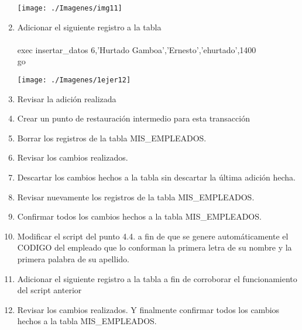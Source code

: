 \begin{enumerate}[1.]
	\begin{center}
	\texttt{[image: ./Imagenes/img11]} 
	\end{center}

	\item Adicionar el siguiente registro a la tabla
           \\
	\\exec insertar\_datos 6,'Hurtado Gamboa','Ernesto','ehurtado',1400
	\\ go

	\begin{center}
	\texttt{[image: ./Imagenes/1ejer12]} 
	\end{center}

	\item Revisar la adición realizada
	\item Crear un punto de restauración intermedio para esta transacción
	\item Borrar los registros de la tabla MIS\_EMPLEADOS.
	\item Revisar los cambios realizados.
	\item Descartar los cambios hechos a la tabla sin descartar la última adición hecha.
	\item Revisar nuevamente los registros de la tabla MIS\_EMPLEADOS.
	\item Confirmar todos los cambios hechos a la tabla MIS\_EMPLEADOS.
	\item Modificar el script del punto 4.4. a fin de que se genere automáticamente el CODIGO del empleado que lo conforman la primera letra de su nombre y la primera palabra de su apellido.
	\item Adicionar el siguiente registro a la tabla a fin de corroborar el funcionamiento del script anterior
	\item Revisar los cambios realizados. Y finalmente confirmar todos los cambios hechos a la tabla MIS\_EMPLEADOS.

\end{enumerate} 
